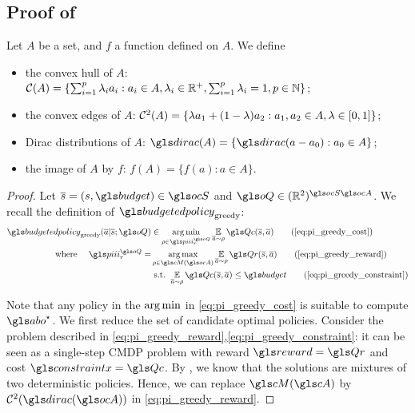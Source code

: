 \begin{subappendices}
\subsection{Proof of }
\label{sec:proof_pi_hull}
\begin{definition}
	\begin{leftbar}[defnbar]
	Let $A$ be a set, and $f$ a function defined on $A$. We define
	
	\begin{itemize}
		\item the convex hull of $A$: $\mathcal{C}(A) = \{\sum_{i=1}^p \lambda_i a_i: a_i\in A, \lambda_i\in\mathbb{R}^+, \sum_{i=1}^p \lambda_i = 1, p\in\mathbb{N}\}$;
		\item the convex edges of $A$: $\mathcal{C}^2(A) = \{\lambda a_1 + (1-\lambda)a_2: a_1, a_2\in A, \lambda\in[0, 1]\}$;
		\item Dirac distributions of $A$: $\dirac(A) = \{\dirac(a-a_0): a_0\in A\}$;
		\item the image of $A$ by $f$: $f(A) = \{f(a): a\in A\}$.
	\end{itemize}
\end{leftbar}
\end{definition}

\begin{proof}
Let $\os=(s,\budget)\in\ocS$ and $\oQ\in(\Real^2)^{\ocS\ocA}$. We recall the definition of $\budgetedpolicy_\text{greedy}$:
    \begin{subequations}
        \begin{align}
            \budgetedpolicy_\text{greedy}(\oa|\os; \oQ) &\in \argmin_{\rho\in\policies_r^{\oQ}} \expectedvalueover{\oa\sim\rho}\Qc(\os, \oa) \tag{\ref{eq:pi_greedy_cost}}\\
            \text{where }\quad\policies_r^{\oQ} = &\argmax_{\rho\in\cM(\ocA)} \expectedvalueover{\oa\sim\rho} \Qr(\os, \oa) \tag{\ref{eq:pi_greedy_reward}}\\
            & \text{ s.t. }  \expectedvalueover{\oa\sim\rho} \Qc(\os, \oa) \leq \budget \tag{\ref{eq:pi_greedy_constraint}}
        \end{align}
    \end{subequations}

    Note that any policy in the $\operatorname*{arg\,min}$ in \eqref{eq:pi_greedy_cost} is suitable to compute $\abo^{\star}$.
    We first reduce the set of candidate optimal policies.
    Consider the problem described in \eqref{eq:pi_greedy_reward},\eqref{eq:pi_greedy_constraint}: it can be seen as a single-step \gls{CMDP} problem with reward $\reward=\Qr$ and cost $\constraint=\Qc$. By \citep[Theorem 4.4][]{BEUTLER1985236}, we know that the solutions are mixtures of two deterministic policies. Hence, we can replace $\cM(\cA)$ by $\cC^2(\dirac(\ocA))$ in \eqref{eq:pi_greedy_reward}.


\end{proof}
\end{subappendices}
